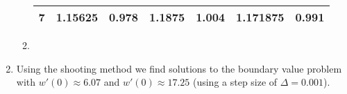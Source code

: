 \begin{enumerate}
\begin{enumerate}
\begin{tabular}{|c||c|c||c|c||c|c|}
			            7   & 1.15625                           & 0.978                                     & 1.1875               & 1.004                                    & 1.171875                           & 0.991                                    \\[10pt]\hline
		            \end{tabular}
                \item 
	      \end{enumerate}
	\item Using the shooting method we find solutions to the boundary value problem with $w'(0)\approx 6.07$ and $w'(0)\approx 17.25$
    (using a step size of $\Delta=0.001$).
\end{enumerate}